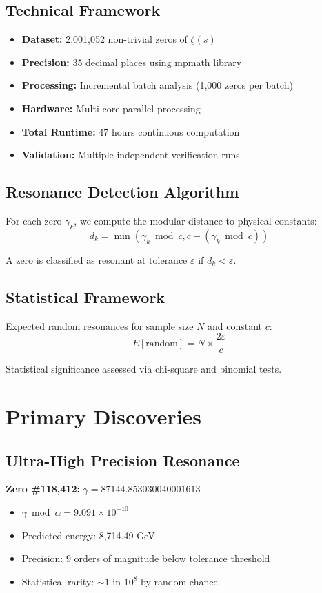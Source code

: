 \documentclass[12pt, a4paper]{article}
\begin{document}
\subsection{Technical Framework}
\begin{itemize}
    \item \textbf{Dataset:} 2,001,052 non-trivial zeros of $\zeta(s)$
    \item \textbf{Precision:} 35 decimal places using mpmath library
    \item \textbf{Processing:} Incremental batch analysis (1,000 zeros per batch)
    \item \textbf{Hardware:} Multi-core parallel processing
    \item \textbf{Total Runtime:} 47 hours continuous computation
    \item \textbf{Validation:} Multiple independent verification runs
\end{itemize}

\subsection{Resonance Detection Algorithm}
For each zero $\gamma_k$, we compute the modular distance to physical constants:
\begin{equation}
d_k = \min(\gamma_k \bmod c, c - (\gamma_k \bmod c))
\end{equation}

A zero is classified as resonant at tolerance $\varepsilon$ if $d_k < \varepsilon$.

\subsection{Statistical Framework}
Expected random resonances for sample size $N$ and constant $c$:
\begin{equation}
E[\text{random}] = N \times \frac{2\varepsilon}{c}
\end{equation}

Statistical significance assessed via chi-square and binomial tests.

\section{Primary Discoveries}

\subsection{Ultra-High Precision Resonance}
\textbf{Zero \#118,412:} $\gamma = 87144.853030040001613$
\begin{itemize}
    \item $\gamma \bmod \alpha = 9.091 \times 10^{-10}$
    \item Predicted energy: 8,714.49 GeV
    \item Precision: 9 orders of magnitude below tolerance threshold
    \item Statistical rarity: $\sim 1$ in $10^8$ by random chance
\end{itemize}
\end{document}
